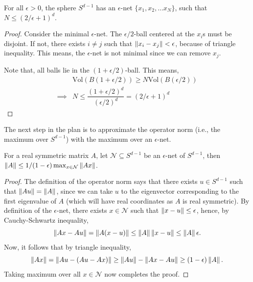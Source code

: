 \documentclass[12pt]{article}
\begin{document}
\begin{lemmabox}
    For all $\epsilon > 0$, the sphere $S^{d-1}$ has an $\epsilon$-net $\{ x_1, x_2, \dots x_N\}$, such that $N \leq (2/\epsilon + 1)^d$.
\end{lemmabox}
\begin{proof}
    Consider the minimal $\epsilon$-net. The $\epsilon/2$-ball centered at the $x_i$s must be disjoint. If not, there exists $i \neq j$ such that $\left\Vert x_i - x_j \right\Vert < \epsilon$, because of triangle inequality. This means, the $\epsilon$-net is not minimal since we can remove $x_j$. 

    Note that, all balls lie in the $(1 + \epsilon/2)$-ball. This means,
    \begin{align*}
        & \text{Vol}(B(1+\epsilon/2)) \geq N \text{Vol}(B(\epsilon/2))\\
        \implies & N \leq \dfrac{(1+\epsilon/2)^d}{(\epsilon/2)^d} = (2/\epsilon + 1)^d
    \end{align*}
\end{proof}
\noindent The next step in the plan is to approximate the operator norm (i.e., the maximum over $S^{d-1}$) with the maximum over an $\epsilon$-net. 

\begin{lemmabox}
    For a real symmetric matrix $A$, let $\mathcal{N} \subseteq S^{d-1}$ be an $\epsilon$-net of $S^{d-1}$, then $\left\Vert A \right\Vert \leq 1/(1-\epsilon) \max_{x \in \mathcal{N}}\left\Vert Ax \right\Vert$.
\end{lemmabox}
\begin{proof}
    The definition of the operator norm says that there exists $u \in S^{d-1}$ such that $\left\Vert Au \right\Vert = \left\Vert A \right\Vert$, since we can take $u$ to the eigenvector corresponding to the first eigenvalue of $A$ (which will have real coordinates as $A$ is real symmetric). By definition of the $\epsilon$-net, there exists $x \in \mathcal{N}$ such that $\left\Vert x - u \right\Vert \leq \epsilon$, hence, by Cauchy-Schwartz inequality,
    \begin{equation*}
        \left\Vert Ax - Au \right\Vert = \left\Vert A(x -u) \right\Vert \leq \left\Vert A \right\Vert\left\Vert x-u \right\Vert \leq \left\Vert A \right\Vert\epsilon.
    \end{equation*}
    \noindent Now, it follows that by triangle inequality,
    \begin{equation*}
        \left\Vert Ax \right\Vert = \left\Vert Au - (Au - Ax) \right\Vert \geq \left\Vert Au \right\Vert - \left\Vert Ax - Au \right\Vert \geq (1 - \epsilon)\left\Vert A \right\Vert.
    \end{equation*}
    \noindent Taking maximum over all $x \in \mathcal{N}$ now completes the proof.
\end{proof}
\end{document}
